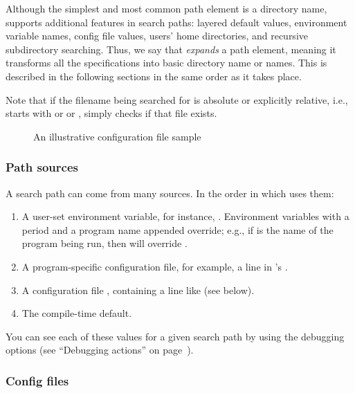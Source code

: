 \documentclass{article}
\begin{document}
Although the simplest and most common path element is a directory
name, \KPS{} supports additional features in search paths: layered
default values, environment variable names, config file values, users'
home directories, and recursive subdirectory searching.  Thus, we say
that \KPS{} \emph{expands} a path element, meaning it transforms all
the specifications into basic directory name or names.  This is
described in the following sections in the same order as it takes
place.

Note that if the filename being searched for is absolute or explicitly
relative, i.e., starts with \samp{/} or  or ,
\KPS{} simply checks if that file exists.

\ifSingleColumn
\else
\begin{figure*}

\setlength{\abovecaptionskip}{0pt}
  \caption{An illustrative configuration file sample}
  \label{fig:config-sample}
\end{figure*}
\fi

\subsubsection{Path sources}
\label{sec:path-sources}

A search path can come from many sources.  In the order in which
\KPS{} uses them:

\begin{enumerate}
\item
  A user-set environment variable, for instance, \@.
  Environment variables with a period and a program name appended
  override; e.g., if  is the name of the program being run,
  then  will override .
\item
  A program-specific configuration file, for exam\-ple, a line
   in 's .
\item   A \KPS{} configuration file , containing a line like
   (see below).
\item The compile-time default.
\end{enumerate}
\noindent You can see each of these values for a given search path by
using the debugging options (see ``Debugging actions'' on
page~\pageref{sec:debugging}).

\subsubsection{Config files}
\end{document}
